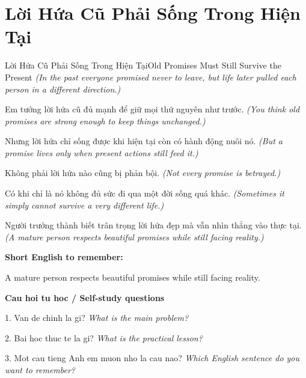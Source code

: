 \section{Lời Hứa Cũ Phải Sống Trong Hiện Tại}
\begin{truyen}{Lời Hứa Cũ Phải Sống Trong Hiện Tại}{Old Promises Must Still Survive the Present}
\textit{(In the past everyone promised never to leave, but life later pulled each person in a different direction.)}

Em tưởng lời hứa cũ đủ mạnh để giữ mọi thứ nguyên như trước.
\textit{(You think old promises are strong enough to keep things unchanged.)}

Nhưng lời hứa chỉ sống được khi hiện tại còn có hành động nuôi nó.
\textit{(But a promise lives only when present actions still feed it.)}

Không phải lời hứa nào cũng bị phản bội.
\textit{(Not every promise is betrayed.)}

Có khi chỉ là nó không đủ sức đi qua một đời sống quá khác.
\textit{(Sometimes it simply cannot survive a very different life.)}

\end{truyen}

\begin{baihoc}
Người trưởng thành biết trân trọng lời hứa đẹp mà vẫn nhìn thẳng vào thực tại.
\textit{(A mature person respects beautiful promises while still facing reality.)}
\end{baihoc}

\begin{ghinhoanh}
\textbf{Short English to remember:}

A mature person respects beautiful promises while still facing reality.

\end{ghinhoanh}

\begin{tuhocnhanh}
\textbf{Cau hoi tu hoc / Self-study questions}

1. Van de chinh la gi? \textit{What is the main problem?}

2. Bai hoc thuc te la gi? \textit{What is the practical lesson?}

3. Mot cau tieng Anh em muon nho la cau nao? \textit{Which English sentence do you want to remember?}
\end{tuhocnhanh}
\ngancach

